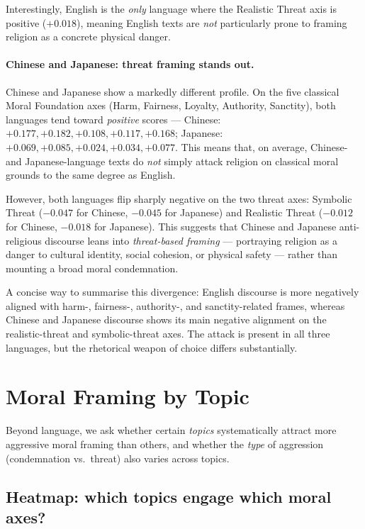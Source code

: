 \documentclass[../CLthesis.tex]{subfiles}
\begin{document}
Interestingly, English is the \emph{only} language where the Realistic Threat axis is positive ($+0.018$), meaning English texts are \emph{not} particularly prone to framing religion as a concrete physical danger.

\paragraph{Chinese and Japanese: threat framing stands out.}
Chinese and Japanese show a markedly different profile. On the five classical Moral Foundation axes (Harm, Fairness, Loyalty, Authority, Sanctity), both languages tend toward \emph{positive} scores — Chinese: $+0.177, +0.182, +0.108, +0.117, +0.168$; Japanese: $+0.069, +0.085, +0.024, \allowbreak +0.034, +0.077$. This means that, on average, Chinese- and Japanese-language texts do \emph{not} simply attack religion on classical moral grounds to the same degree as English.

However, both languages flip sharply negative on the two threat axes: Symbolic Threat ($-0.047$ for Chinese, $-0.045$ for Japanese) and Realistic Threat ($-0.012$ for Chinese, $-0.018$ for Japanese). This suggests that Chinese and Japanese anti-religious discourse leans into \emph{threat-based framing} — portraying religion as a danger to cultural identity, social cohesion, or physical safety — rather than mounting a broad moral condemnation.

A concise way to summarise this divergence: English discourse is more negatively aligned with harm-, fairness-, authority-, and sanctity-related frames, whereas Chinese and Japanese discourse shows its main negative alignment on the realistic-threat and symbolic-threat axes. The attack is present in all three languages, but the rhetorical weapon of choice differs substantially.


\section{Moral Framing by Topic}
\label{sec:rq3_topic}

Beyond language, we ask whether certain \emph{topics} systematically attract more aggressive moral framing than others, and whether the \emph{type} of aggression (condemnation vs.\ threat) also varies across topics.

\subsection*{Heatmap: which topics engage which moral axes?}
\end{document}
